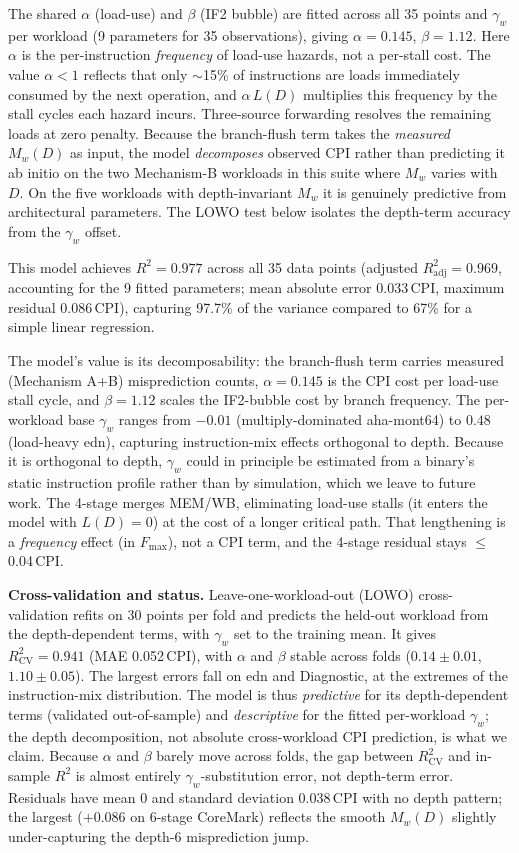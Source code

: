 \documentclass[acmsmall,nonacm,screen]{acmart}
\begin{document}
The shared $\alpha$ (load-use) and $\beta$ (IF2 bubble) are fitted across all 35 points and $\gamma_w$ per workload (9 parameters for 35 observations), giving $\alpha = 0.145$, $\beta = 1.12$.
Here $\alpha$ is the per-instruction \emph{frequency} of load-use hazards, not a per-stall cost. The value $\alpha < 1$ reflects that only $\sim$15\% of instructions are loads immediately consumed by the next operation, and $\alpha\,L(D)$ multiplies this frequency by the stall cycles each hazard incurs. Three-source forwarding resolves the remaining loads at zero penalty.
Because the branch-flush term takes the \emph{measured} $M_w(D)$ as input, the model \emph{decomposes} observed CPI rather than predicting it ab initio on the two Mechanism-B workloads in this suite where $M_w$ varies with $D$. On the five workloads with depth-invariant $M_w$ it is genuinely predictive from architectural parameters. The LOWO test below isolates the depth-term accuracy from the $\gamma_w$ offset.

This model achieves $R^2 = 0.977$ across all 35 data points (adjusted $R^2_{\text{adj}} = 0.969$, accounting for the 9 fitted parameters; mean absolute error 0.033\,CPI, maximum residual 0.086\,CPI), capturing 97.7\% of the variance compared to 67\% for a simple linear regression.

The model's value is its decomposability: the branch-flush term carries measured (Mechanism A+B) misprediction counts, $\alpha = 0.145$ is the CPI cost per load-use stall cycle, and $\beta = 1.12$ scales the IF2-bubble cost by branch frequency.
The per-workload base $\gamma_w$ ranges from $-0.01$ (multiply-dominated aha-mont64) to $0.48$ (load-heavy edn), capturing instruction-mix effects orthogonal to depth. Because it is orthogonal to depth, $\gamma_w$ could in principle be estimated from a binary's static instruction profile rather than by simulation, which we leave to future work.
The 4-stage merges MEM/WB, eliminating load-use stalls (it enters the model with $L(D)=0$) at the cost of a longer critical path. That lengthening is a \emph{frequency} effect (in $F_{\max}$), not a CPI term, and the 4-stage residual stays $\leq$0.04\,CPI.

\textbf{Cross-validation and status.}
Leave-one-workload-out (LOWO) cross-validation refits on 30 points per fold and predicts the held-out workload from the depth-dependent terms, with $\gamma_w$ set to the training mean. It gives $R^2_{\text{CV}} = 0.941$ (MAE 0.052\,CPI), with $\alpha$ and $\beta$ stable across folds ($0.14 \pm 0.01$, $1.10 \pm 0.05$). The largest errors fall on edn and Diagnostic, at the extremes of the instruction-mix distribution.
The model is thus \emph{predictive} for its depth-dependent terms (validated out-of-sample) and \emph{descriptive} for the fitted per-workload $\gamma_w$; the depth decomposition, not absolute cross-workload CPI prediction, is what we claim.
Because $\alpha$ and $\beta$ barely move across folds, the gap between $R^2_{\text{CV}}$ and in-sample $R^2$ is almost entirely $\gamma_w$-substitution error, not depth-term error.
Residuals have mean 0 and standard deviation 0.038\,CPI with no depth pattern; the largest ($+$0.086 on 6-stage CoreMark) reflects the smooth $M_w(D)$ slightly under-capturing the depth-6 misprediction jump.
\end{document}
